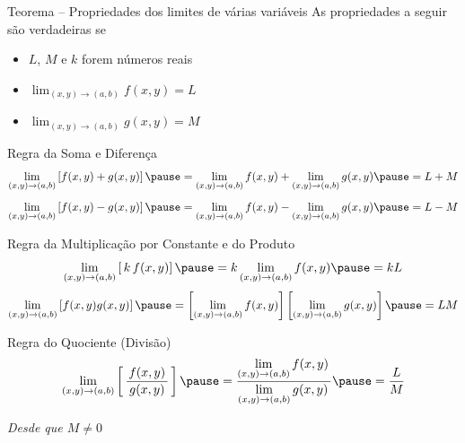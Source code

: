 \documentclass[fleqn,utf8,aspectratio=169,12pt]{beamer}
\begin{document}
\begin{frame}{Teorema -- Propriedades dos limites de várias variáveis}
  As propriedades a seguir são verdadeiras se
  \begin{itemize}[<+->]
    \setlength\itemsep{1.5em}
    \item $L$, $M$ e $k$ forem números reais
    \item \(\lim_{(x, y)\to(a, b)} f(x, y) = L\)
    \item \(\lim_{(x, y)\to(a, b)} g(x, y) = M\)
  \end{itemize}
\end{frame}

\begin{frame}{Regra da Soma e Diferença}
  \[
    \lim_{(x, y)\to(a, b)} \left[f(x, y) + g(x, y)\right]
    \pause =
    \lim_{(x, y)\to(a, b)} f(x, y) + \lim_{(x, y)\to(a, b)} g(x, y)
    \pause =
    L + M
  \]
  \pause
  \vspace{\baselineskip}
  \[
    \lim_{(x, y)\to(a, b)} \left[f(x, y) - g(x, y)\right]
    \pause =
    \lim_{(x, y)\to(a, b)} f(x, y) - \lim_{(x, y)\to(a, b)} g(x, y)
    \pause =
    L - M
  \]
\end{frame}

\begin{frame}{Regra da Multiplicação por Constante e do Produto}
  \[
    \lim_{(x, y)\to(a, b)} \left[\,k\, f(x, y)\right]
    \pause =
    k \lim_{(x, y)\to(a, b)} f(x, y)
    \pause =
    k L
  \]
  \pause
  \vspace{\baselineskip}
  \[
    \lim_{(x, y)\to(a, b)} \left[f(x, y) g(x, y)\right]
    \pause =
    \left[\lim_{(x, y)\to(a, b)} f(x, y) \right]
    \left[\lim_{(x, y)\to(a, b)} g(x, y) \right]
    \pause =
    LM
  \]
\end{frame}

\begin{frame}{Regra do Quociente (Divisão)}
  \[
    \lim_{(x, y)\to(a, b)} \left[ \,\frac{\,f(x, y)\,}{g(x, y)} \, \right]
    \pause =
    \dfrac{\displaystyle\lim_{(x, y)\to(a, b)} f(x, y)\,}
          {\displaystyle\lim_{(x, y)\to(a, b)} g(x, y)\,}
    \pause =
    \frac{L}{M}
  \]

  \pause
  \emph{Desde que \(M\neq 0\)}
\end{frame}
\end{document}
